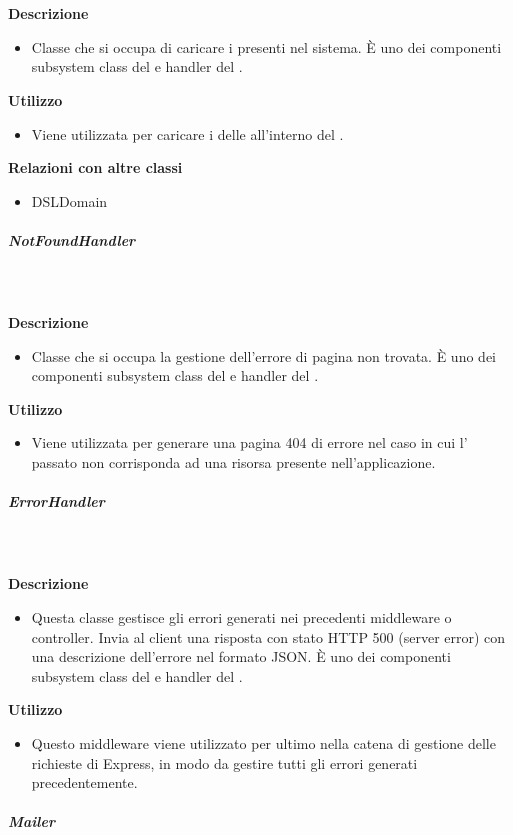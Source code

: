         \textbf{\\ \\ Descrizione} 
          \begin{itemize}
            \item[] Classe che si occupa di caricare i  presenti nel sistema. È uno dei componenti subsystem class del   e handler del  .
          \end{itemize}      
        \textbf{Utilizzo}  
          \begin{itemize}
            \item[] Viene utilizzata per caricare i  delle  all'interno del .
          \end{itemize}
          \textbf{Relazioni con altre classi}
          \begin{itemize}
              \item{DSLDomain}
          \end{itemize}
      \subparagraph{NotFoundHandler}
        
        \textbf{\\ \\ Descrizione} 
          \begin{itemize}
            \item[] Classe che si occupa la gestione dell'errore di pagina non trovata. È uno dei componenti subsystem class del   e handler del  .
          \end{itemize}      
        \textbf{Utilizzo}  
          \begin{itemize}
            \item[] Viene utilizzata per generare una pagina 404 di errore nel caso in cui l' passato non corrisponda ad una risorsa presente nell'applicazione.
          \end{itemize}
      \subparagraph{ErrorHandler}
        
        \textbf{\\ \\ Descrizione} 
          \begin{itemize}
            \item[] Questa classe gestisce gli errori generati nei precedenti middleware o controller. Invia al client una risposta con stato HTTP 500 (server error) con una descrizione dell'errore nel formato JSON.
È uno dei componenti subsystem class del   e handler del  .
          \end{itemize}      
        \textbf{Utilizzo}  
          \begin{itemize}
            \item[] Questo middleware viene utilizzato per ultimo nella catena di gestione delle richieste di Express, in modo da gestire tutti gli errori generati precedentemente.
          \end{itemize}
      \subparagraph{Mailer}
        
